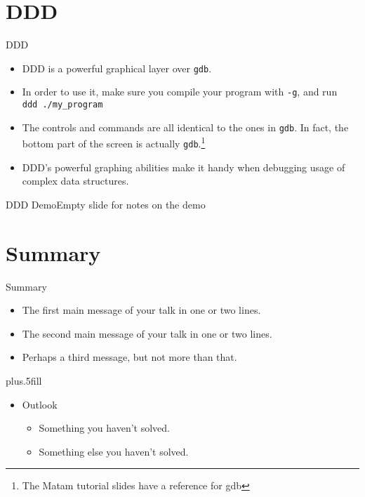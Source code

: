 \documentclass{beamer}
\begin{document}
\section{DDD}

\begin{frame}{DDD}
  \begin{itemize}
    \item DDD is a powerful graphical layer over \texttt{gdb}.
    \item In order to use it, make sure you compile your program with
      \texttt{-g}, and run \\
      \texttt{ddd ./my\_program}
    \item The controls and commands are all identical to the ones in
      \texttt{gdb}. In fact, the bottom part of the screen is actually
      \texttt{gdb}.\footnote{The Matam tutorial slides have a reference
      for gdb}
    \item DDD's powerful graphing abilities make it handy when debugging
      usage of complex data structures.
  \end{itemize}
\end{frame}

 {
\begin{frame}{DDD Demo}{Empty slide for notes on the demo}
\end{frame}
}

\section*{Summary}

\begin{frame}{Summary}

  \begin{itemize}
  \item
    The \alert{first main message} of your talk in one or two lines.
  \item
    The \alert{second main message} of your talk in one or two lines.
  \item
    Perhaps a \alert{third message}, but not more than that.
  \end{itemize}
  
  \vskip0pt plus.5fill
  \begin{itemize}
  \item
    Outlook
    \begin{itemize}
    \item
      Something you haven't solved.
    \item
      Something else you haven't solved.
    \end{itemize}
  \end{itemize}
\end{frame}
\end{document}
